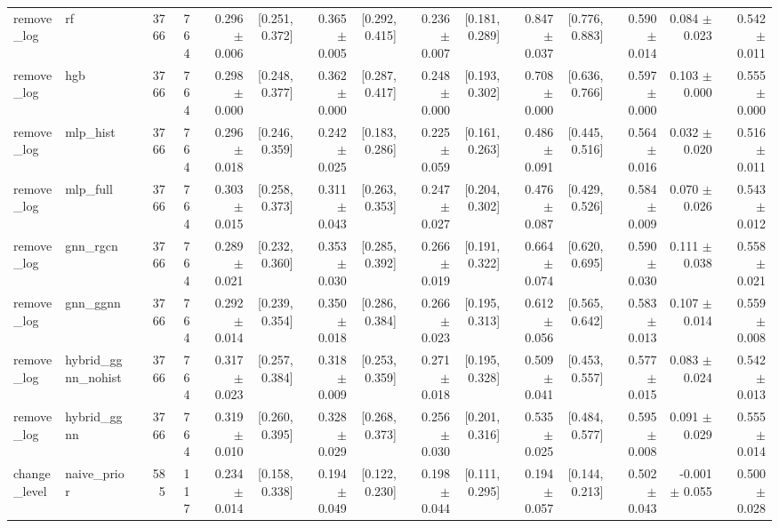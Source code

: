 \begin{table}[htbp]
{\begin{tabular}{llrrrrrrrrrrrrrr}
remove\_log & rf &  & 3766 & 764 & 0.296 $\pm$ 0.006 & [0.251, 0.372] & 0.365 $\pm$ 0.005 & [0.292, 0.415] & 0.236 $\pm$ 0.007 & [0.181, 0.289] & 0.847 $\pm$ 0.037 & [0.776, 0.883] & 0.590 $\pm$ 0.014 & 0.084 $\pm$ 0.023 & 0.542 $\pm$ 0.011 \\
remove\_log & hgb &  & 3766 & 764 & 0.298 $\pm$ 0.000 & [0.248, 0.377] & 0.362 $\pm$ 0.000 & [0.287, 0.417] & 0.248 $\pm$ 0.000 & [0.193, 0.302] & 0.708 $\pm$ 0.000 & [0.636, 0.766] & 0.597 $\pm$ 0.000 & 0.103 $\pm$ 0.000 & 0.555 $\pm$ 0.000 \\
remove\_log & mlp\_hist &  & 3766 & 764 & 0.296 $\pm$ 0.018 & [0.246, 0.359] & 0.242 $\pm$ 0.025 & [0.183, 0.286] & 0.225 $\pm$ 0.059 & [0.161, 0.263] & 0.486 $\pm$ 0.091 & [0.445, 0.516] & 0.564 $\pm$ 0.016 & 0.032 $\pm$ 0.020 & 0.516 $\pm$ 0.011 \\
remove\_log & mlp\_full &  & 3766 & 764 & 0.303 $\pm$ 0.015 & [0.258, 0.373] & 0.311 $\pm$ 0.043 & [0.263, 0.353] & 0.247 $\pm$ 0.027 & [0.204, 0.302] & 0.476 $\pm$ 0.087 & [0.429, 0.526] & 0.584 $\pm$ 0.009 & 0.070 $\pm$ 0.026 & 0.543 $\pm$ 0.012 \\
remove\_log & gnn\_rgcn &  & 3766 & 764 & 0.289 $\pm$ 0.021 & [0.232, 0.360] & 0.353 $\pm$ 0.030 & [0.285, 0.392] & 0.266 $\pm$ 0.019 & [0.191, 0.322] & 0.664 $\pm$ 0.074 & [0.620, 0.695] & 0.590 $\pm$ 0.030 & 0.111 $\pm$ 0.038 & 0.558 $\pm$ 0.021 \\
remove\_log & gnn\_ggnn &  & 3766 & 764 & 0.292 $\pm$ 0.014 & [0.239, 0.354] & 0.350 $\pm$ 0.018 & [0.286, 0.384] & 0.266 $\pm$ 0.023 & [0.195, 0.313] & 0.612 $\pm$ 0.056 & [0.565, 0.642] & 0.583 $\pm$ 0.013 & 0.107 $\pm$ 0.014 & 0.559 $\pm$ 0.008 \\
remove\_log & hybrid\_ggnn\_nohist &  & 3766 & 764 & 0.317 $\pm$ 0.023 & [0.257, 0.384] & 0.318 $\pm$ 0.009 & [0.253, 0.359] & 0.271 $\pm$ 0.018 & [0.195, 0.328] & 0.509 $\pm$ 0.041 & [0.453, 0.557] & 0.577 $\pm$ 0.015 & 0.083 $\pm$ 0.024 & 0.542 $\pm$ 0.013 \\
remove\_log & hybrid\_ggnn &  & 3766 & 764 & 0.319 $\pm$ 0.010 & [0.260, 0.395] & 0.328 $\pm$ 0.029 & [0.268, 0.373] & 0.256 $\pm$ 0.030 & [0.201, 0.316] & 0.535 $\pm$ 0.025 & [0.484, 0.577] & 0.595 $\pm$ 0.008 & 0.091 $\pm$ 0.029 & 0.555 $\pm$ 0.014 \\
change\_level & naive\_prior &  & 585 & 117 & 0.234 $\pm$ 0.014 & [0.158, 0.338] & 0.194 $\pm$ 0.049 & [0.122, 0.230] & 0.198 $\pm$ 0.044 & [0.111, 0.295] & 0.194 $\pm$ 0.057 & [0.144, 0.213] & 0.502 $\pm$ 0.043 & -0.001 $\pm$ 0.055 & 0.500 $\pm$ 0.028 \\

\end{tabular}}
\end{table}
